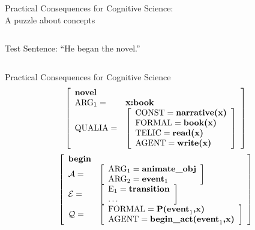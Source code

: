 \documentclass{beamer}
\begin{document}
\begin{frame}{Practical Consequences for Cognitive Science: \\ A puzzle about concepts}
\begin{columns}
\begin{center}
Test Sentence: ``He began the novel.''
\end{center}
\end{columns}
\end{frame}

\begin{frame}{Practical Consequences for Cognitive Science}
$$\left[
\begin{array}{l l}
\textbf{novel} & \\
\text{ARG}_1 = & \textbf{x:book} \\
\text{QUALIA} = & \left[ \begin{array}{l}
				\text{CONST}=\textbf{narrative(x)} \\
				\text{FORMAL}=\textbf{book(x)} \\
				\text{TELIC}=\textbf{read(x)} \\
				\text{AGENT}=\textbf{write(x)}
				\end{array}\right] \\
\end{array}
\right]$$
\vspace{.125in}
$$\left[
\begin{array}{l l}
\textbf{begin} & \\
\mathcal{A} = & \left[ \begin{array}{l}
	\text{ARG}_1=\textbf{animate\_obj} \\
	\text{ARG}_2=\textbf{event}_1 \\
	\end{array}\right] \\
\mathcal{E} = & \left[ \begin{array}{l}
	\text{E}_1=\textbf{transition} \\
	\mathellipsis \\
	\end{array}\right] \\
\mathcal{Q} = &  \left[ \begin{array}{l}
	\text{FORMAL}=\textbf{P(event}_1\textbf{,x)} \\
	\text{AGENT} = \textbf{begin\_act(event}_1\textbf{,x}\textbf{)} \\
	\end{array}\right] \\
\end{array}
\right]$$
\end{frame}
\end{document}
